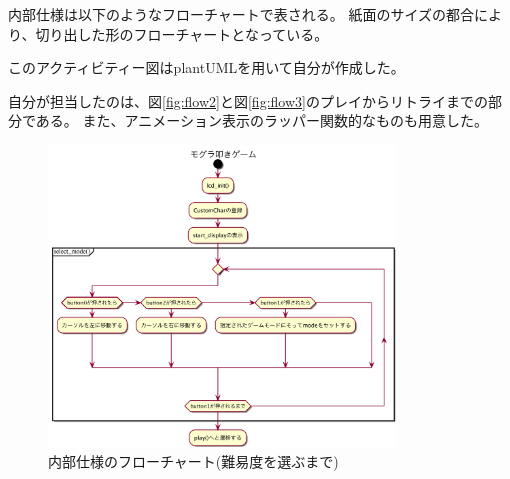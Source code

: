 \documentclass[11pt,a4j]{jsarticle}
\makeatletter
\newcommand{\figcaption}[1]{\def\@captype{figure}\caption{#1}}
\makeatother
\begin{document}
内部仕様は以下のようなフローチャートで表される。
紙面のサイズの都合により、切り出した形のフローチャートとなっている。

このアクティビティー図はplantUMLを用いて自分が作成した。

自分が担当したのは、図\ref{fig:flow2}と図\ref{fig:flow3}のプレイからリトライまでの部分である。
また、アニメーション表示のラッパー関数的なものも用意した。

\begin{figure}[H]
  \centering
  \includegraphics[height=80mm,bb=0 0 3154 2741]{img/mogura_init.png}
  \figcaption{内部仕様のフローチャート(難易度を選ぶまで)}
  \label{fig:flow1}
\end{figure}
\end{document}
